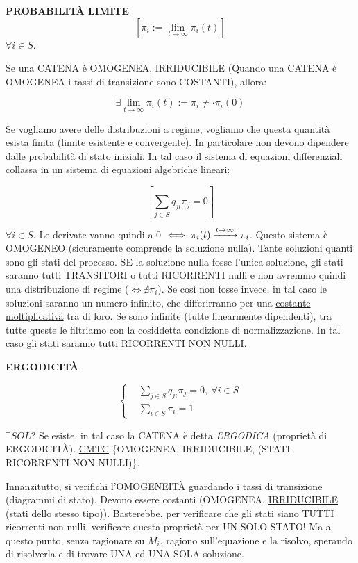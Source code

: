 \begin{defn}{\textbf{PROBABILIT\`A LIMITE}}
\[
	[\pi_i := \lim_{t\to\infty}{\pi_i(t)}]
\]
$\forall i\in S$.
\end{defn}

Se una CATENA è OMOGENEA, IRRIDUCIBILE (Quando una CATENA è OMOGENEA i tassi di transizione sono COSTANTI), allora:

\[
	\exists \lim_{t\to\infty}{\pi_i(t)} := \pi_i \neq \mathord{\cdot} \pi_i(0)
\]

Se vogliamo avere delle distribuzioni a regime, vogliamo che questa quantità esista finita (limite esistente e convergente). In particolare non devono dipendere dalle probabilità di \underline{stato iniziali}. In tal caso il sistema di equazioni differenziali collassa in un sistema di equazioni algebriche lineari:

\[
	[\sum_{j\in S}{q_{ji}\pi_j} = 0]
\]

$\forall i\in S$. Le derivate vanno quindi a 0 $\iff \pi_i(t) \tendsto{t\to\infty} \pi_i$. Questo sistema è OMOGENEO (sicuramente comprende la soluzione nulla). Tante soluzioni quanti sono gli stati del processo. SE la soluzione nulla fosse l'unica soluzione, gli stati saranno tutti TRANSITORI o tutti RICORRENTI nulli e non avremmo quindi una distribuzione di regime ($\iff \nexists \pi_i$). Se così non fosse invece, in tal caso le soluzioni saranno un numero infinito, che differirranno per una \underline{costante moltiplicativa} tra di loro. Se sono infinite (tutte linearmente dipendenti), tra tutte queste le filtriamo con la cosiddetta condizione di normalizzazione. In tal caso gli stati saranno tutti \underline{RICORRENTI NON NULLI}.

\begin{defn}{\textbf{ERGODICIT\`A}}

\[
	\left\{
	\begin{aligned}
	&\sum_{j\in S}{q_{ji}\pi_j} = 0,\ \forall i\in S\\
	&\sum_{i\in S}{\pi_i} = 1
	\end{aligned}
	\right.
\]

$\exists SOL$? Se esiste, in tal caso la CATENA è detta \textit{ERGODICA} (proprietà di ERGODICIT\`A). \underline{CMTC} \{OMOGENEA, IRRIDUCIBILE, (STATI RICORRENTI NON NULLI)\}.\end{defn}

Innanzitutto, si verifichi l'OMOGENEIT\`A guardando i tassi di transizione (diagrammi di stato). Devono essere costanti (OMOGENEA, \underline{\underline{IRRIDUCIBILE}} (stati dello stesso tipo)). Basterebbe, per verificare che gli stati siano TUTTI ricorrenti non nulli, verificare questa proprietà per UN SOLO STATO! Ma a questo punto, senza ragionare su $M_i$, ragiono sull'equazione e la risolvo, sperando di risolverla e di trovare UNA ed UNA SOLA soluzione.


